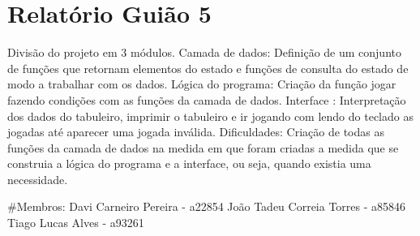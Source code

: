 \section*{Relatório Guião 5}

Divisão do projeto em 3 módulos. Camada de dados\+: Definição de um conjunto de funções que retornam elementos do estado e funções de consulta do estado de modo a trabalhar com os dados. Lógica do programa\+: Criação da função jogar fazendo condições com as funções da camada de dados. Interface \+: Interpretação dos dados do tabuleiro, imprimir o tabuleiro e ir jogando com lendo do teclado as jogadas até aparecer uma jogada inválida. Dificuldades\+: Criação de todas as funções da camada de dados na medida em que foram criadas a medida que se construia a lógica do programa e a interface, ou seja, quando existia uma necessidade.

\#\+Membros\+: Davi Carneiro Pereira -\/ a22854 João Tadeu Correia Torres -\/ a85846 Tiago Lucas Alves -\/ a93261 